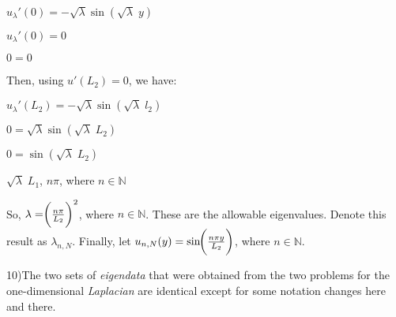 \documentclass[12pt, executivepaper]{article}
\begin{document}
\begin{flushleft}
\begin{center}
$u_{\lambda}'(0)=-\sqrt{\lambda}\sin(\sqrt{\lambda} \; y)$

$u_{\lambda}'(0)=0$

$0=0$

\end{center}

\vspace{3mm}

Then, using $u'(L_{2})=0$, we have: 

\begin{center}

$u_{\lambda}'(L_{2})=-\sqrt{\lambda}\sin(\sqrt{\lambda} \; l_{2})$

$0=\sqrt{\lambda}\sin(\sqrt{\lambda} \; L_{2})$

$0=\sin(\sqrt{\lambda} \; L_{2})$

$\sqrt{\lambda} \; L_{1}$, $n\pi$, where $n \in \mathbb{N}$

\end{center}

\vspace{3mm}

So, $\lambda= \hspace{-1mm} \bigg(\frac{n\pi}{L_{2}}\bigg)^2$, where $n \in \mathbb{N}$. These are the allowable eigenvalues. Denote this result as $\lambda_{n,N}$. Finally, let $u_{n,N}(y)=\sin \hspace{-1mm} \bigg(\frac{n \pi y}{L_{2}}\bigg)$, where $n \in \mathbb{N}$.

\end{flushleft}

\pagebreak

\vspace*{-40mm}

10)The two sets of \textit{eigendata} that were obtained from the two problems for the one-dimensional \textit{Laplacian} are identical except for some notation changes here and there.
\end{document}
